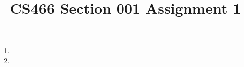 \documentclass[12pt]{article}
\title{CS466 Section 001 Assignment 1}
\begin{document}
\maketitle

\begin{enumerate}
\item
\item
\end{enumerate}
\end{document}
